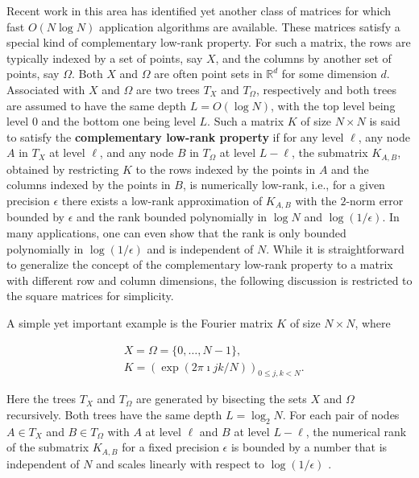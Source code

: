 Recent work in this area has identified yet another class of matrices for which fast $O(N\log N)$ application algorithms are available. These matrices satisfy a special kind of complementary low-rank property. For such a matrix, the rows are typically indexed by a set of points, say $X$, and the columns by another set of points, say
$\Omega$. Both $X$ and $\Omega$ are often point sets in $\mathbb{R}^d$ for some dimension $d$. Associated with $X$ and $\Omega$ are two trees $T_X$ and $T_\Omega$, respectively and both trees are assumed to have the same depth $L=O(\log N)$, with the top level being level $0$ and the bottom one being level $L$. Such a matrix $K$ of size $N\times N$ is said to satisfy the {\bf complementary low-rank property} if for any level $\ell$, any node $A$ in $T_X$ at level $\ell$, and any node $B$ in $T_\Omega$ at level $L-\ell$, the submatrix $K_{A,B}$, obtained by restricting $K$ to the rows indexed by the points in $A$ and the columns indexed by the points in $B$, is numerically low-rank, i.e., for a given precision $\epsilon$ there exists a low-rank approximation of $K_{A,B}$ with the $2$-norm error bounded by $\epsilon$ and the rank bounded polynomially in $\log N$ and $\log(1/\epsilon)$.  In many applications, one can even show that the rank is only bounded polynomially in $\log(1/\epsilon)$ and is independent of $N$. While it is straightforward to generalize the concept of the complementary low-rank property to a matrix with different row and column dimensions, the following discussion is restricted to the square matrices for simplicity.

A simple yet important example is the Fourier matrix $K$ of size
$N\times N$, where

\begin{align*}
  & X = \Omega = \{0,\ldots, N-1\},\\
  & K = \left(\exp(2\pi \imath jk/N) \right)_{0\le j,k< N}.
\end{align*}

Here the trees $T_{X}$ and $T_{\Omega}$ are generated by bisecting the sets $X$ and $\Omega$ recursively. Both trees have the same depth
$L=\log_2 N$. For each pair of nodes $A \in T_{X}$ and $B\in
T_{\Omega}$ with $A$ at level $\ell$ and $B$ at level $L-\ell$, the numerical rank of the submatrix $K_{A,B}$ for a fixed precision
$\epsilon$ is bounded by a number that is independent of $N$ and scales linearly with respect to $\log(1/\epsilon)$ \cite{Butterfly2}.

